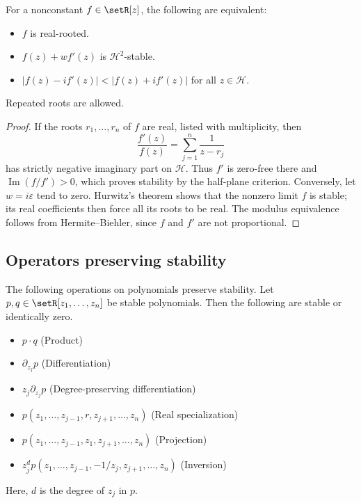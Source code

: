 \begin{corollary}
For a nonconstant $f\in\setR[z]$, the following are equivalent:
\begin{itemize}
\item $f$ is real-rooted.
\item $f(z)+wf'(z)$ is $\mathcal H^2$-stable.
\item $|f(z)-if'(z)|<|f(z)+if'(z)|$ for all $z\in\mathcal H$.
\end{itemize}
Repeated roots are allowed.
\end{corollary}

\begin{proof}
If the roots $r_1,\dotsc,r_n$ of $f$ are real, listed with
multiplicity, then
\[
 \frac{f'(z)}{f(z)}=\sum_{j=1}^n\frac{1}{z-r_j}
\]
has strictly negative imaginary part on $\mathcal H$.
Thus $f'$ is zero-free there and $\operatorname{Im}(f/f')>0$,
which proves stability by the half-plane criterion.
Conversely, let $w=i\varepsilon$ tend to zero.
Hurwitz's theorem shows that the nonzero limit $f$ is stable;
its real coefficients then force all its roots to be real.
The modulus equivalence follows from Hermite--Biehler,
since $f$ and $f'$ are not proportional.
\end{proof}

\subsection[stabilityOperators]{Operators preserving stability}

\begin{theorem}
The following operations on polynomials preserve stability.
Let $p,q \in \setR[z_1,\dotsc,z_n]$ be stable polynomials.
Then the following are stable or identically zero.
\begin{itemize}
\item $p\cdot q$ (Product)
\item $\partial_{z_j} p$ (Differentiation)
\item $z_j \partial_{z_j} p$ (Degree-preserving differentiation)
\item $p(z_1,\dotsc,z_{j-1},r,z_{j+1},\dotsc,z_n)$ (Real specialization)
\item $p(z_1,\dotsc,z_{j-1},z_1,z_{j+1},\dotsc,z_n)$ (Projection)
\item $z_j^d p(z_1,\dotsc,z_{j-1},-1/z_{j},z_{j+1},\dotsc,z_n)$ (Inversion)
\end{itemize}
Here, $d$ is the degree of $z_j$ in $p$.
\end{theorem}


